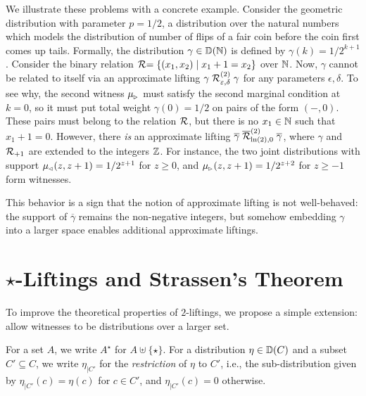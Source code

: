 \documentclass{lmcs}
\begin{document}
\begin{exa}
  We illustrate these problems with a concrete example. Consider the geometric
  distribution with parameter $p = 1/2$, a distribution over the natural numbers
  which models the distribution of number of flips of a fair coin before the
  coin first comes up tails. Formally, the distribution $\gamma \in {\mathbb{D}}(\mathbb{N})$
  is defined by $\gamma(k) = 1 / 2^{k + 1}$. Consider the binary relation $\mathrel{\mathcal{R}} =
  \{ (x_1, x_2) \mid x_1 + 1 = x_2 \}$ over $\mathbb{N}$. Now, $\gamma$ cannot be
  related to itself via an approximate lifting $\gamma
  \mathrel{\mathrel{\mathcal{R}}^{(2)}_{\varepsilon, \delta}} \gamma$ for any parameters $\epsilon,
  \delta$. To see why, the second witness $\mu_{\mspace{-1.5mu}{\scriptscriptstyle \vartriangleright}}$ must satisfy the second
  marginal condition at $k = 0$, so it must put total weight $\gamma(0) = 1/2$
  on pairs of the form $(-, 0)$. These pairs must belong to the relation $\mathrel{\mathcal{R}}$,
  but there is no $x_1 \in \mathbb{N}$ such that $x_1 + 1 = 0$.  However, there
  \emph{is} an approximate lifting $\overline{\gamma}
  \mathrel{\overline{\mathrel{\mathcal{R}}}^{(2)}_{\ln(2), 0}} \overline{\gamma}$, where $\gamma$ and
  $\mathrel{\mathcal{R}}_{+1}$ are extended to the integers $\mathbb{Z}$. For instance, the two joint
  distributions with support $\mu_{\mspace{-1.5mu}{\scriptscriptstyle \vartriangleleft}}(z, z + 1) = 1/2^{z + 1}$ for $z \geq 0$,
  and $\mu_{\mspace{-1.5mu}{\scriptscriptstyle \vartriangleright}}(z, z+ 1) = 1/2^{z + 2}$ for $z \geq - 1$ form witnesses.

  This behavior is a sign that the notion of approximate lifting is not
  well-behaved: the support of $\overline{\gamma}$ remains the non-negative
  integers, but somehow embedding $\gamma$ into a larger space enables
  additional approximate liftings.
\end{exa}
\section{%
  \texorpdfstring
  {$\star$-Liftings and Strassen's Theorem}
  {*-Liftings and Strassen's Theorem}}
\label{s:star}

To improve the theoretical properties of $2$-liftings, we propose a simple
extension: allow witnesses to be distributions over a larger set.

\begin{nota}
  For a set $A$, we write $A^\star$ for $A \uplus \{ \star \}$. For a
  distribution $\eta \in {\mathbb{D}}(C)$ and a subset $C' \subseteq C$, we write
  $\eta_{|C'}$ for the \emph{restriction} of $\eta$ to $C'$, i.e., the
  sub-distribution given by $\eta_{|C'}(c) = \eta(c)$ for $c \in C'$, and
  $\eta_{|C'}(c) = 0$ otherwise.
\end{nota}
\end{document}
